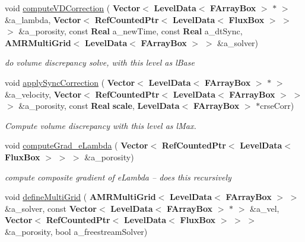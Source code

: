 \begin{DoxyCompactItemize}
void \hyperlink{class_projector_a6e07f1d02ca8606d9672e4005ebfe4a7}{compute\+V\+D\+Correction} (\textbf{ Vector}$<$ \textbf{ Level\+Data}$<$ \textbf{ F\+Array\+Box} $>$ $\ast$ $>$ \&a\+\_\+lambda, \textbf{ Vector}$<$ \textbf{ Ref\+Counted\+Ptr}$<$ \textbf{ Level\+Data}$<$ \textbf{ Flux\+Box} $>$ $>$ $>$ \&a\+\_\+porosity, const \textbf{ Real} a\+\_\+new\+Time, const \textbf{ Real} a\+\_\+dt\+Sync, \textbf{ A\+M\+R\+Multi\+Grid}$<$ \textbf{ Level\+Data}$<$ \textbf{ F\+Array\+Box} $>$ $>$ \&a\+\_\+solver)
\begin{DoxyCompactList}\small\item\em do volume discrepancy solve, with this level as l\+Base \end{DoxyCompactList}\item 
void \hyperlink{class_projector_ae631800ea52b4cd4b446ef86a697fb3f}{apply\+Sync\+Correction} (\textbf{ Vector}$<$ \textbf{ Level\+Data}$<$ \textbf{ F\+Array\+Box} $>$ $\ast$ $>$ \&a\+\_\+velocity, \textbf{ Vector}$<$ \textbf{ Ref\+Counted\+Ptr}$<$ \textbf{ Level\+Data}$<$ \textbf{ F\+Array\+Box} $>$ $>$ $>$ \&a\+\_\+porosity, const \textbf{ Real} \textbf{ scale}, \textbf{ Level\+Data}$<$ \textbf{ F\+Array\+Box} $>$ $\ast$crse\+Corr)
\begin{DoxyCompactList}\small\item\em Compute volume discrepancy with this level as l\+Max. \end{DoxyCompactList}\item 
\mbox{\label{class_projector_a08af2ad88a5cd0e72725d5992f81d613}} 
void \hyperlink{class_projector_a08af2ad88a5cd0e72725d5992f81d613}{compute\+Grad\+\_\+e\+Lambda} (\textbf{ Vector}$<$ \textbf{ Ref\+Counted\+Ptr}$<$ \textbf{ Level\+Data}$<$ \textbf{ Flux\+Box} $>$ $>$ $>$ \&a\+\_\+porosity)
\begin{DoxyCompactList}\small\item\em compute composite gradient of e\+Lambda -- does this recursively \end{DoxyCompactList}\item 
void \hyperlink{class_projector_a75e907d5ebcf83bdf5c59761578dcf68}{define\+Multi\+Grid} (\textbf{ A\+M\+R\+Multi\+Grid}$<$ \textbf{ Level\+Data}$<$ \textbf{ F\+Array\+Box} $>$ $>$ \&a\+\_\+solver, const \textbf{ Vector}$<$ \textbf{ Level\+Data}$<$ \textbf{ F\+Array\+Box} $>$ $\ast$ $>$ \&a\+\_\+vel, \textbf{ Vector}$<$ \textbf{ Ref\+Counted\+Ptr}$<$ \textbf{ Level\+Data}$<$ \textbf{ Flux\+Box} $>$ $>$ $>$ \&a\+\_\+porosity, bool a\+\_\+freestream\+Solver)

\end{DoxyCompactItemize}

